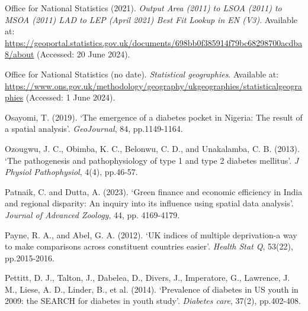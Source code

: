 \begin{Reference}
\begin{flushleft}
Office for National Statistics (2021). \textit{Output Area (2011) to LSOA (2011) to MSOA (2011) LAD to LEP (April 2021) Best Fit Lookup in EN (V3)}. Available at: \url{https://geoportal.statistics.gov.uk/documents/698bb0f385914f79bc68298700acdba8/about} (Accessed: 20 June 2024).
\end{flushleft}
\vspace{2pt}


\begin{flushleft}
Office for National Statistics (no date). \textit{Statistical geographies}. Available at: \url{https://www.ons.gov.uk/methodology/geography/ukgeographies/statisticalgeographies} (Accessed: 1 June 2024).
\end{flushleft}
\vspace{2pt}


\begin{flushleft}
Osayomi, T. (2019). `The emergence of a diabetes pocket in Nigeria: The result of a spatial analysis'. \textit{GeoJournal}, 84, pp.1149-1164.
\end{flushleft}
\vspace{2pt}


\begin{flushleft}
Ozougwu, J. C., Obimba, K. C., Belonwu, C. D., and Unakalamba, C. B. (2013). `The pathogenesis and pathophysiology of type 1 and type 2 diabetes mellitus'. \textit{J Physiol Pathophysiol}, 4(4), pp.46-57.
\end{flushleft}
\vspace{2pt}


\begin{flushleft}
Patnaik, C. and Dutta, A. (2023). `Green finance and economic efficiency in India and regional disparity: An inquiry into its influence using spatial data analysis'. \textit{Journal of Advanced Zoology}, 44, pp. 4169-4179.
\end{flushleft}
\vspace{2pt}


\begin{flushleft}
Payne, R. A., and Abel, G. A. (2012). `UK indices of multiple deprivation-a way to make comparisons across constituent countries easier'. \textit{Health Stat Q}, 53(22), pp.2015-2016.
\end{flushleft}
\vspace{2pt}


\begin{flushleft}
Pettitt, D. J., Talton, J., Dabelea, D., Divers, J., Imperatore, G., Lawrence, J. M., Liese, A. D., Linder, B., et al. (2014). `Prevalence of diabetes in US youth in 2009: the SEARCH for diabetes in youth study'. \textit{Diabetes care}, 37(2), pp.402-408.
\end{flushleft}
\vspace{2pt}



\end{Reference}

